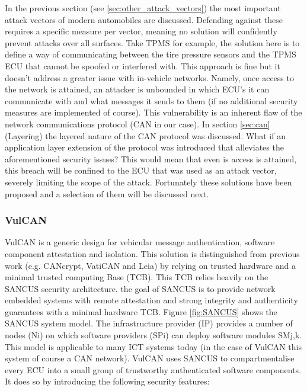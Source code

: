 \documentclass[master=cws,masteroption=vs,english]{kulemt}
\begin{document}
In the previous section (see \ref{sec:other_attack_vectors}) the most important attack vectors of modern automobiles are discussed. Defending against these requires a specific measure per vector, meaning no solution will confidently prevent attacks over all surfaces. Take TPMS for example, the solution here is to define a way of communicating between the tire pressure sensors and the TPMS ECU that cannot be spoofed or interfered with. This approach is fine but it doesn't address a greater issue with in-vehicle networks. Namely, once access to the network is attained, an attacker is unbounded in which ECU's it can communicate with and what messages it sends to them (if no additional security measures are implemented of course). This vulnerability is an inherent flaw of the network communications protocol (CAN in our case). In section \ref{sec:can} (Layering) the layered nature of the CAN protocol was discussed. What if an application layer extension of the protocol was introduced that alleviates the aforementioned security issues? This would mean that even is access is attained, this breach will be confined to the ECU that was used as an attack vector, severely limiting the scope of the attack. Fortunately these solutions have been proposed and a selection of them will be discussed next.

\subsubsection{VulCAN} 
VulCAN is a generic design for vehicular message authentication, software component attestation and isolation. This solution is distinguished from previous work (e.g. CANcrypt\cite{Pfeiffer}, VatiCAN\cite{VatiCAN} and Leia\cite{Leia}) by relying on trusted hardware and a minimal trusted computing Base (TCB). This TCB relies heavily on the SANCUS\cite{Sancus} security architecture. the goal of SANCUS is to provide network embedded systems with remote attestation and strong integrity and authenticity guarantees with a minimal hardware TCB. Figure \ref{fig:SANCUS} shows the SANCUS system model. The infrastructure provider (IP) provides a number of nodes (Ni) on which software providers (SPi) can deploy software modules SMj,k. This model is applicable to many ICT systems today (in the case of VulCAN this system of course a CAN network).\cite{Sancus} VulCAN uses SANCUS to compartmentalise every ECU into a small group of trustworthy authenticated software components. It does so by introducing the following security features: 
\end{document}
